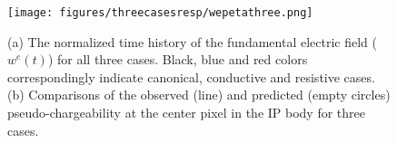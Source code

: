 \documentclass[a4paper, 11pt]{article}
\begin{document}
\begin{figure}[htb]
  \centering  \texttt{[image: figures/threecasesresp/wepetathree.png]}
  \caption{(a) The normalized time history of the fundamental electric field ($w^e(t)$) for all three cases. Black, blue and red colors correspondingly indicate canonical, conductive and resistive cases. (b) Comparisons of the observed (line) and predicted (empty circles) pseudo-chargeability at the center pixel in the IP body for three cases.}
  \label{F:wepetathree}
\end{figure}
\end{document}
